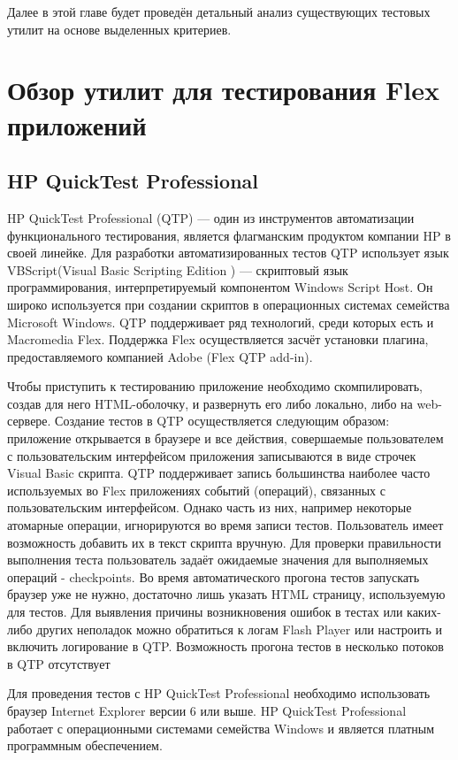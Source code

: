 Далее в этой главе будет проведён детальный анализ существующих тестовых 
утилит на основе выделенных критериев. 

\section{Обзор утилит для тестирования Flex приложений}

\subsection{HP QuickTest Professional}

HP QuickTest Professional (QTP) — один из инструментов автоматизации 
функционального тестирования, является флагманским продуктом компании 
HP в своей линейке. Для разработки автоматизированных тестов QTP 
использует язык VBScript(Visual Basic Scripting Edition ) — скриптовый 
язык программирования, интерпретируемый компонентом Windows Script Host.
Он широко используется при создании скриптов в операционных системах
семейства Microsoft Windows. QTP поддерживает ряд технологий, среди
которых есть и Macromedia Flex. Поддержка Flex осуществляется засчёт
установки плагина, предоставляемого компанией Adobe (Flex QTP add-in).

Чтобы приступить к тестированию приложение необходимо скомпилировать, 
создав для него HTML-оболочку, и развернуть его либо локально, либо на 
web-сервере. Создание тестов в QTP осуществляется следующим образом:
приложение открывается в браузере и все действия, совершаемые пользователем с 
пользовательским интерфейсом приложения записываются в виде строчек Visual Basic скрипта. 
QTP поддерживает запись большинства наиболее часто используемых во Flex 
приложениях событий (операций), связанных с пользовательским интерфейсом. 
Однако часть из них, например некоторые атомарные операции, игнорируются 
во время записи тестов. Пользователь имеет возможность добавить их в 
текст скрипта вручную. Для проверки правильности выполнения теста 
пользователь задаёт ожидаемые значения для выполняемых операций - 
checkpoints. Во время автоматического прогона тестов запускать браузер 
уже не нужно, достаточно лишь указать HTML страницу, используемую для 
тестов. Для выявления причины возникновения ошибок в тестах или каких-либо 
других неполадок можно обратиться к логам Flash Player или настроить и 
включить логирование в QTP. Возможность прогона тестов в несколько потоков
в QTP отсутствует

Для проведения тестов с HP QuickTest Professional необходимо использовать
 браузер Internet Explorer версии 6 или выше. HP QuickTest Professional 
работает с операционными системами семейства Windows и является платным 
программным обеспечением.

